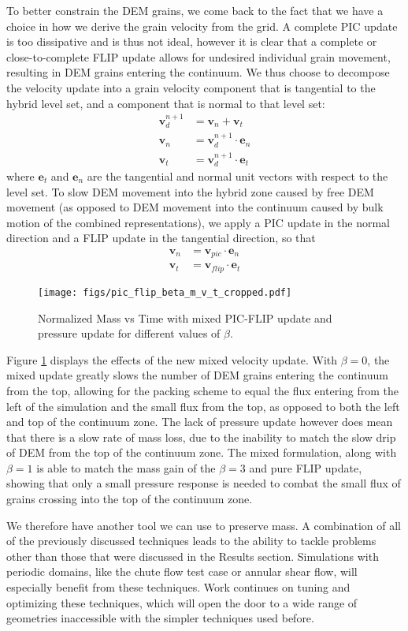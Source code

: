 To better constrain the DEM grains, we come back to the fact that we have a choice in how we derive the grain velocity from the grid. A complete PIC update is too dissipative and is thus not ideal, however it is clear that a complete or close-to-complete FLIP update allows for undesired individual grain movement, resulting in DEM grains entering the continuum. We thus choose to decompose the velocity update into a grain velocity component that is tangential to the hybrid level set, and a component that is normal to that level set:
\begin{align}
\bm{v}^{n+1}_d &= \bm{v}_n+\bm{v}_t\\
\bm{v}_n &= \bm{v}^{n+1}_d \cdot \bm{e}_n \\
\bm{v}_t &= \bm{v}^{n+1}_d \cdot \bm{e}_t
\end{align}
where $\bm{e}_t$ and $\bm{e}_n$ are the tangential and normal unit vectors with respect to the level set. To slow DEM movement into the hybrid zone caused by free DEM movement (as opposed to DEM movement into the continuum caused by bulk motion of the combined representations), we apply a PIC update in the normal direction and a FLIP update in the tangential direction, so that
\begin{align}
\bm{v}_n &= \bm{v}_{pic} \cdot \bm{e}_n \\
\bm{v}_t &= \bm{v}_{flip} \cdot \bm{e}_t
\end{align}

\begin{figure}[htp] 
    \centering
    \texttt{[image: figs/pic\_flip\_beta\_m\_v\_t\_cropped.pdf]}
    \caption{Normalized Mass vs Time with mixed PIC-FLIP update and pressure update for different values of $\beta$.}
    \label{pic_flip_beta_m_v_t}
\end{figure}

Figure \ref{pic_flip_beta_m_v_t} displays the effects of the new mixed velocity update. With $\beta=0$, the mixed update greatly slows the number of DEM grains entering the continuum from the top, allowing for the packing scheme to equal the flux entering from the left of the simulation and the small flux from the top, as opposed to both the left and top of the continuum zone.  The lack of pressure update however does mean that there is a slow rate of mass loss, due to the inability to match the slow drip of DEM from the top of the continuum zone. The mixed formulation, along with $\beta=1$ is able to match the mass gain of the $\beta=3$ and pure FLIP update, showing that only a small pressure response is needed to combat the small flux of grains crossing into the top of the continuum zone.

We therefore have another tool we can use to preserve mass. A combination of all of the previously discussed techniques leads to the ability to tackle problems other than those that were discussed in the Results section. Simulations with periodic domains, like the chute flow test case or annular shear flow, will especially benefit from these techniques. Work continues on tuning and optimizing these techniques, which will open the door to a wide range of geometries inaccessible with the simpler techniques used before.